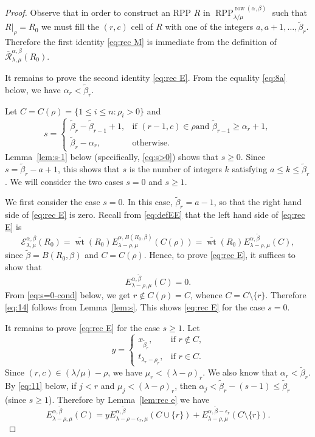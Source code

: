 \documentclass[12pt]{amsart}
\numberwithin{equation}{section}
\theoremstyle{definition}
\newcommand\wb{\widetilde{\beta}}
\newcommand\row{\operatorname{row}}
\newcommand\RPP{\operatorname{RPP}}
\newcommand\lm{{\lambda/\mu}}
\newcommand\wt{\operatorname{wt}}
\newcommand\R{\mathcal{R}}
\newcommand\oR{\overline{\R}}
\newcommand\EE{\mathcal{E}}
\newcommand\owt{\overline{\wt}}
\begin{document}
\begin{proof}
  Observe that in order to construct an RPP $R$ in
  $\RPP^{\row(\alpha,\beta)}_\lm$ such that $R|_\rho=R_0$ we must fill the
  $(r,c)$ cell of $R$ with one of the integers $a,a+1,\dots,\wb_r$. Therefore
  the first identity \eqref{eq:rec M} is immediate from the definition of
  $\oR^{\alpha,\beta}_{\lambda,\mu}(R_0)$.

  It remains to prove the second identity \eqref{eq:rec E}.
  From the equality \eqref{eq:8a} below, we have $\alpha_r < \wb_r$.

  Let $C=C(\rho)=\{1\le i\le n:
  \rho_i>0\}$ and
    \begin{equation}\label{eq:s}
s = \begin{cases}
  \wb_r-\wb_{r-1}+1, & \mbox{if $(r-1,c)\in\rho$
  and $\wb_{r-1}\ge\alpha_r+1$} ,\\
\wb_r-\alpha_r, &\mbox{otherwise} . 
\end{cases}
  \end{equation}
  Lemma~\ref{lem:s-1} below (specifically, \eqref{eq:s>0})
  shows that $s\ge0$. Since $s = \wb_r - a + 1$, this
  shows that $s$ is the number of integers $k$ satisfying $a\le k\le \wb_r$. We
  will consider the two cases $s=0$ and $s\ge1$.

  We first consider the case $s=0$. In this case, $\wb_r = a-1$,
  so that the right hand side of
  \eqref{eq:rec E} is zero. Recall from \eqref{eq:defEE} that the left
  hand side of \eqref{eq:rec E} is
  \[
    \EE_{\lambda,\mu}^{\alpha,\beta}(R_0) = \owt(R_0)
    E_{\lambda-\rho,\mu}^{\alpha,B(R_0,\beta)}(C(\rho)) = \owt(R_0)
    E_{\lambda-\rho,\mu}^{\alpha,\wb}(C),
\]
since $\wb=B(R_0,\beta)$ and $C = C(\rho)$.
Hence, to prove \eqref{eq:rec E}, it suffices to show that
  \begin{equation}
    \label{eq:14}
  E_{\lambda-\rho,\mu}^{\alpha,\wb}(C) = 0.
  \end{equation}
  From \eqref{eq:s=0-cond} below, we get $r \notin C(\rho) = C$,
  whence $C=C\setminus\{r\}$.
Therefore \eqref{eq:14} follows from Lemma~\ref{lem:s}.
This shows \eqref{eq:rec E} for the case $s=0$.

It remains to prove \eqref{eq:rec E} for the case $s\ge1$. Let
\[
y =
\begin{cases}
  x_{\wb_r}, &\mbox{if $r\not\in C$,}\\
  t_{\lambda_r-\rho_r}, &\mbox{if $r\in C$.}
\end{cases}
\]
Since $(r,c)\in(\lm)-\rho$, we have $\mu_r<(\lambda-\rho)_r$.
We also know that $\alpha_r<\wb_r$. By \eqref{eq:11} below,
if $j<r$ and
$\mu_j<(\lambda-\rho)_r$, then $\alpha_j<\wb_r-(s-1) \le \wb_r$
(since $s \ge 1$). Therefore by
Lemma~\ref{lem:rec e} we have
\begin{equation}\label{eq:e=ye+e}
   E^{\alpha,\wb}_{\lambda-\rho,\mu}(C) 
   = y E^{\alpha,\wb}_{\lambda-\rho-\epsilon_r,\mu}(C\cup\{r\})
       +E_{\lambda-\rho,\mu}^{\alpha,\wb-\epsilon_r}(C\setminus\{r\}).
\end{equation}


\end{proof}
\end{document}
